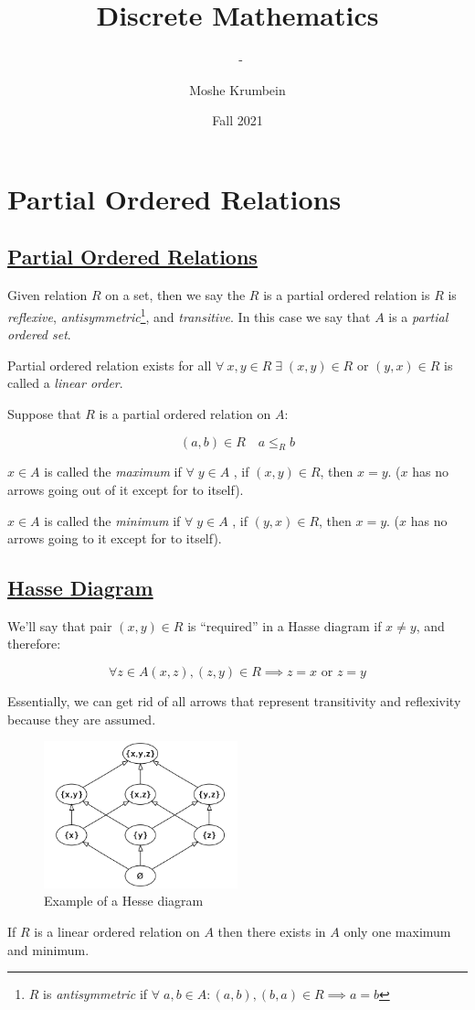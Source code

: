 \documentclass[00_complete]{subfiles}
\title{Discrete Mathematics}
\author{Moshe Krumbein}
\date{Fall 2021}
\begin{document}
\setcounter{chapter}{3}

\chapter{Partial Ordered Relations}
\subtitle{\theauthor~- \thedate}
\section{\href{https://en.wikipedia.org/wiki/Partially_ordered_set\#Partial_order_relation}{Partial Ordered Relations}}

Given relation \(R\) on a set, then we say the \(R\) is a partial
ordered relation is \(R\) is \emph{reflexive},
\emph{antisymmetric}\footnote{\(R\) is \emph{antisymmetric} if
  \(\forall \; a,b \in A: (a,b), (b,a) \in R \implies  a=b\)}, and
  \emph{transitive}. In this case we say that \(A\) is a \emph{partial
ordered set}.

\begin{definition}
Partial ordered relation exists for all
\(\forall \: x,y \in R \;\exists\; (x,y) \in R\) or \((y,x) \in R\) is
called a \emph{linear order}.
\end{definition}

Suppose that \(R\) is a partial ordered relation on \(A\):

\[(a,b) \in R \quad a \leq_R b\]

\(x \in A\) is called the \emph{maximum} if \(\forall \; y \in A\) , if
\((x,y) \in R\), then \(x=y\). (\(x\) has no arrows going out of it
except for to itself).

\(x \in A\) is called the \emph{minimum} if \(\forall \; y \in A\) , if
\((y,x) \in R\), then \(x=y\). (\(x\) has no arrows going to it except
for to itself).

\section{\href{https://en.wikipedia.org/wiki/Hasse_diagram}{Hasse
Diagram}}

We'll say that pair \((x,y) \in R\) is ``required'' in a Hasse diagram
if \(x \neq y\), and therefore:

\[\forall z \in A (x,z),(z,y) \in R \implies z=x \text{ or } z=y\]

Essentially, we can get rid of all arrows that represent transitivity and
reflexivity because they are assumed.

\begin{figure}[ht]
    \centering
    \includegraphics[width=0.5\textwidth]{w4-hesse}
    \caption{Example of a Hesse diagram}
\end{figure}

\begin{claim}
If \(R\) is a linear ordered relation on \(A\) then there exists in
\(A\) only one maximum and minimum.
\end{claim}
\end{document}
